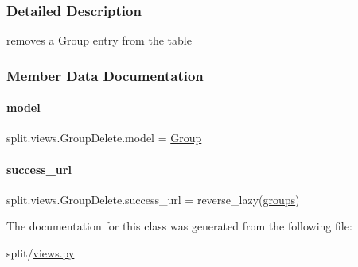 \subsubsection{Detailed Description}
removes a Group entry from the table 

\subsubsection{Member Data Documentation}
\mbox{\label{classsplit_1_1views_1_1GroupDelete_a0d1fed74b229e13e410383a61afcd94f}} 
\paragraph{\texorpdfstring{model}{model}}
{\footnotesize\ttfamily split.\+views.\+Group\+Delete.\+model = \hyperlink{classsplit_1_1models_1_1Group}{Group}\hspace{0.3cm}{\ttfamily [static]}}

\mbox{\label{classsplit_1_1views_1_1GroupDelete_a68e5d1602d12c5db02a6a20c2f6da3ae}} 
\paragraph{\texorpdfstring{success\+\_\+url}{success\_url}}
{\footnotesize\ttfamily split.\+views.\+Group\+Delete.\+success\+\_\+url = reverse\+\_\+lazy(\textquotesingle{}\hyperlink{namespacesplit_1_1views_a419d7fc72bf890d32aba4fc21c7568d6}{groups}\textquotesingle{})\hspace{0.3cm}{\ttfamily [static]}}



The documentation for this class was generated from the following file\+:\begin{DoxyCompactItemize}
\item 
split/\hyperlink{split_2views_8py}{views.\+py}\end{DoxyCompactItemize}
